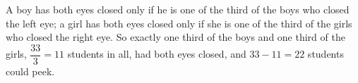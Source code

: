 A boy has both eyes closed only if he is one of the third of the boys who closed the left eye; a girl has both eyes closed only if she is one of the third of the girls who closed the right eye. So exactly one third of the boys and one third of the girls, $\dfrac{33}{3}=11$ students in all, had both eyes closed, and $33-11=\boxed{22}$ students could peek.
